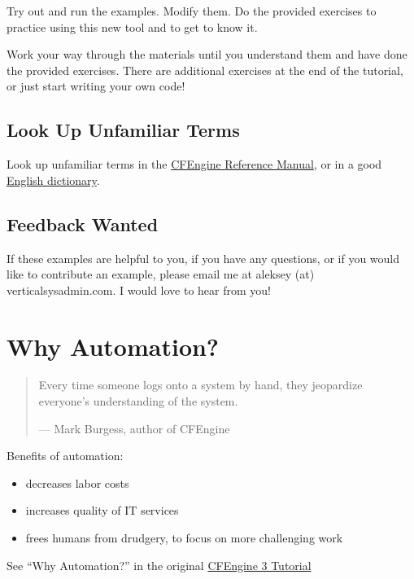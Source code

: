 Try out and run the examples. Modify them. Do the provided
exercises to practice using this new tool and to get to know
it.

Work your way through the materials until you understand them
and have done the provided exercises. There are additional
exercises at the end of the tutorial, or just start writing
your own code!





\subsection{Look Up Unfamiliar Terms}

Look up unfamiliar terms in the \href{http://docs.cfengine.com}{CFEngine Reference
Manual}, or in a good \href{http://www.onelook.com}{English
dictionary}.





\subsection{Feedback Wanted}

If these examples are helpful to you, if you have any questions,
or if you would like to contribute an example, please email me
at aleksey (at) verticalsysadmin.com. I would love to hear from you!





\section{Why Automation?}

\begin{quotation}
Every time someone logs onto a system by hand, they jeopardize
everyone's understanding of the system.

--- Mark Burgess, author of CFEngine
\end{quotation}

Benefits of automation:

\begin{itemize}
\item{} decreases labor costs
\item{} increases quality of IT services
\item{} frees humans from drudgery, to focus on more challenging work
\end{itemize}

See ``Why Automation?'' in the original \href{https://auth.cfengine.com/archive/manuals/cf3-tutorial#Why-automation_003f}{CFEngine 3 Tutorial}





